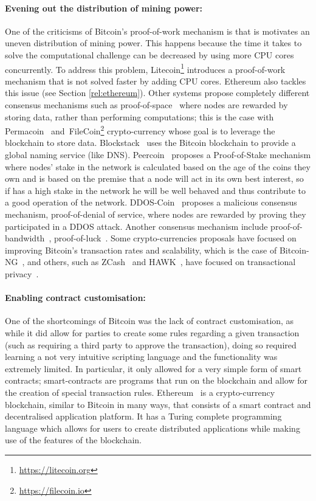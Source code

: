 \paragraph{Evening out the distribution of mining power:} One of the criticisms of Bitcoin's proof-of-work mechanism is that is motivates an uneven distribution of mining power. This happens because the time it takes to solve the computational challenge can be decreased by using more CPU cores concurrently. To address this problem, Litecoin\footnote{\url{https://litecoin.org}} introduces a proof-of-work mechanism that is not solved faster by adding CPU cores. Ethereum also tackles this issue (see Section \ref{rel:ethereum}). Other systems propose completely different consensus mechanisms such as proof-of-space~\cite{Dziembowski:2015gs} where nodes are rewarded by storing data, rather than performing computations; this is the case with Permacoin~\cite{Miller:2014kb} and~FileCoin\footnote{\url{https://filecoin.io}} crypto-currency whose goal is to leverage the blockchain to store data. Blockstack~\cite{Ali:2016vq} uses the Bitcoin blockchain to provide a global naming service (like DNS). Peercoin~\cite{King:2012ur} proposes a Proof-of-Stake mechanism where nodes' stake in the network is calculated based on the age of the coins they own and is based on the premise that a node will act in its own best interest, so if has a high stake in the network he will be well behaved and thus contribute to a good operation of the network. DDOS-Coin~\cite{Wustrow:2016tda} proposes a malicious consensus mechanism, proof-of-denial of service, where nodes are rewarded by proving they participated in a DDOS attack. Another consensus mechanism include proof-of-bandwidth~\cite{Ghosh:2014wo}, proof-of-luck~\cite{Milutinovic:2016gs}. Some crypto-currencies proposals have focused on improving Bitcoin's transaction rates and scalability, which is the case of Bitcoin-NG~\cite{Luu:2016cl,Eyal:2016vn}, and others, such as ZCash~\cite{Anonymous:zwRGR7mQ} and HAWK~\cite{Kosba:2016iq}, have focused on transactional privacy~\cite{BenSasson:2015in}.

\paragraph{Enabling contract customisation:} One of the shortcomings of Bitcoin was the lack of contract customisation, as while it did allow for parties to create some rules regarding a given transaction (such as requiring a third party to approve the transaction), doing so required learning a not very intuitive scripting language and the functionality was extremely limited. In particular, it only allowed for a very simple form of smart contracts; smart-contracts are programs that run on the blockchain and allow for the creation of special transaction rules. Ethereum~\cite{Wood:2014ur,Buterin:2013ux} is a crypto-currency blockchain, similar to Bitcoin in many ways, that consists of a smart contract and decentralised application platform. It has a Turing complete programming language which allows for users to create distributed applications while making use of the features of the blockchain.

